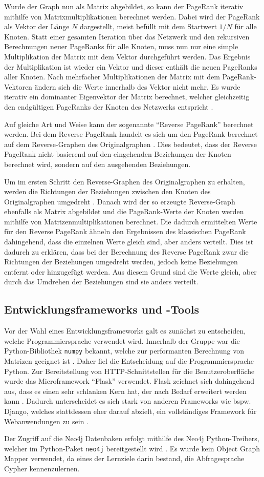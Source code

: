 Wurde der Graph nun als Matrix abgebildet, so kann der PageRank iterativ mithilfe von Matrixmultiplikationen berechnet werden. Dabei wird der PageRank als Vektor der Länge $N$ dargestellt, meist befüllt mit dem Startwert $1/N$ für alle Knoten. Statt einer gesamten Iteration über das Netzwerk und den rekursiven Berechnungen neuer PageRanks für alle Knoten, muss nun nur eine simple Multiplikation der Matrix mit dem Vektor durchgeführt werden. Das Ergebnis der Multiplikation ist wieder ein Vektor und dieser enthält die neuen PageRanks aller Knoten. Nach mehrfacher Multiplikationen der Matrix mit dem PageRank-Vektoren ändern sich die Werte innerhalb des Vektor nicht mehr. Es wurde iterativ ein dominanter Eigenvektor der Matrix berechnet, welcher gleichzeitig den endgültigen PageRanks der Knoten des Netzwerks entspricht \cite{pagerank_eigenvector}.

Auf gleiche Art und Weise kann der sogenannte ``Reverse PageRank'' berechnet werden. Bei dem Reverse PageRank handelt es sich um den PageRank berechnet auf dem Reverse-Graphen des Originalgraphen \cite{reverse_pagerank}. Dies bedeutet, dass der Reverse PageRank nicht basierend auf den eingehenden Beziehungen der Knoten berechnet wird, sondern auf den ausgehenden Beziehungen.

Um im ersten Schritt den Reverse-Graphen des Originalgraphen zu erhalten, werden die Richtungen der Beziehungen zwischen den Knoten des Originalgraphen umgedreht \cite{reverse_pagerank}. Danach wird der so erzeugte Reverse-Graph ebenfalls als Matrix abgebildet und die PageRank-Werte der Knoten werden mithilfe von Matrizenmultiplikationen berechnet. Die dadurch ermittelten Werte für den Reverse PageRank ähneln den Ergebnissen des klassischen PageRank dahingehend, dass die einzelnen Werte gleich sind, aber anders verteilt. Dies ist dadurch zu erklären, dass bei der Berechnung des Reverse PageRank zwar die Richtungen der Beziehungen umgedreht werden, jedoch keine Beziehungen entfernt oder hinzugefügt werden. Aus diesem Grund sind die Werte gleich, aber durch das Umdrehen der Beziehungen sind sie anders verteilt.

\subsection{Entwicklungsframeworks und -Tools}

Vor der Wahl eines Entwicklungsframeworks galt es zunächst zu entscheiden, welche Programmiersprache verwendet wird.
Innerhalb der Gruppe war die Python-Bibliothek \lstinline|numpy| bekannt, welche zur performanten Berechnung von Matrizen geeignet ist \cite{numpy}.
Daher fiel die Entscheidung auf die Programmiersprache Python. Zur Bereitstellung von HTTP-Schnittstellen für die Benutzeroberfläche wurde das Microframework ``Flask'' verwendet.
Flask zeichnet sich dahingehend aus, dass es einen sehr schlanken Kern hat, der nach Bedarf erweitert werden kann \cite{flask}.
Dadurch unterscheidet es sich stark von anderen Frameworks wie bspw. Django, welches stattdessen eher darauf abzielt, ein vollständiges Framework für Webanwendungen zu sein \cite{django}.

Der Zugriff auf die Neo4j Datenbaken erfolgt mithilfe des Neo4j Python-Treibers, welcher im Python-Paket \lstinline|neo4j| bereitgestellt wird \cite{pip_neo4j}.
Es wurde kein Object Graph Mapper verwendet, da eines der Lernziele darin bestand, die Abfragesprache Cypher kennenzulernen.


